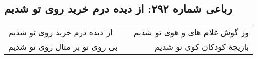 \begin{center}
\section*{رباعی شماره ۲۹۲: از دیده درم خرید روی تو شدیم}
\label{sec:sh292}
\begin{longtable}{l p{0.5cm} r}
از دیده درم خرید روی تو شدیم
&&
وز گوش غلام های و هوی تو شدیم
\\
بی روی تو بر مثال روی تو شدیم
&&
بازیچهٔ کودکان کوی تو شدیم
\\
\end{longtable}
\end{center}
